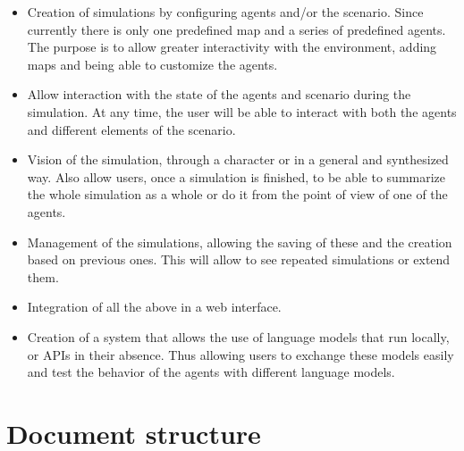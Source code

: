  \begin{itemize}
 	 \item Creation of simulations by configuring agents and/or the scenario. Since currently there is only one predefined map and a series of predefined agents. The purpose is to allow greater interactivity with the environment, adding maps and being able to customize the agents.
 	 
	\item Allow interaction with the state of the agents and scenario during the simulation. At any time, the user will be able to interact with both the agents and different elements of the scenario.
	
	\item Vision of the simulation, through a character or in a general and synthesized way. Also allow users, once a simulation is finished, to be able to summarize the whole simulation as a whole or do it from the point of view of one of the agents.
	
	\item Management of the simulations, allowing the saving of these and the creation based on previous ones. This will allow to see repeated simulations or extend them.
	
	\item Integration of all the above in a web interface.
	
	\item Creation of a system that allows the use of language models that run locally, or APIs in their absence. Thus allowing users to exchange these models easily and test the behavior of the agents with different language models. 
\end{itemize}

\section{Document structure}







